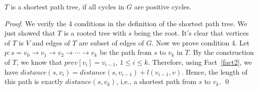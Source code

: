 \begin{claim}
$T$ is a shortest path tree, if all cycles in $G$ are positive cycles.

\end{claim}
\emph{Proof.} We verify the 4 conditions in the definition of the shortest path tree.
We just showed that $T$ is a rooted tree with $s$ being the root.
It's clear that vertices of $T$ is $V$ and edges of $T$ are subset of edges of $G$.
Now we prove condition 4. Let $p: s = v_0 \to v_1 \to v_2 \to \cdots \to v_k$ be the path from $s$ to $v_k$ in $T$.
By the construction of $T$, we know that $prev[v_i] = v_{i - 1}$, $1\le i \le k$.
Therefore, using Fact~\ref{fact2}, we have $distance(s, v_i) = distance(s, v_{i-1}) + l(v_{i-1}, v)$.
Hence, the length of this path is exactly $distance(s,v_k)$, i.e., a shortest path from $s$ to $v_k$. \qed



